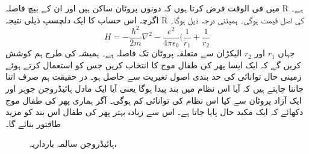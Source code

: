 میں فی الوقت فرض کرتا ہوں کہ دونوں پروٹان ساکن ہیں اور ان کے بیچ فاصلہ R ہے۔ اگرچہ اس حساب کا ایک دلچسپ ذیلی نتیجہ R کی اصل قیمت ہوگی۔ ہمیٹنی درجہ ذیل ہوگا۔
 \[H=-\frac{\hbar^{2}}{2m}\nabla^{2}-\frac{e^{2}}{4\pi\epsilon_{0}}(\frac{1}{r_{1}}+\frac{1}{r_{2}}\]
جہاں
\( r_{1}\) 
اور 
\(r_{2}\) 
الیکڑان سے متعلقہ پروٹان تک فاصلہ ہے۔ ہمیشہ کی طرح ہم کوشش کریں گے کہ ایک ایسا پھر کی طفال موج کا انتخاب کریں جس کو استعمال کرتے ہوئے زمینی حال توانائی کی حد بندی اصول تغیریت سے حاصل ہو۔ در حقیقت ہم صرف اتنا جاننا چاہتے ہیں کہ آیا اس نظام میں بند پیدا ہوگا یعنی آیا ایک مادل ہائیڈروجن جوہر اور ایک آزاد پروٹان سے کیا اس نظام کی توانائی کم ہوگی۔ آگر ہماری پھر کی طفال موج دکھائے کہ ایک مکید حال پایا جاتا ہے۔ اس سے زیادہ بہتر پھر کی طفال اس بند کو مزید طاقتور بنائے گا۔
\begin{figure}
\centering
{}
\caption{ہائیڈروجن سالمہ بارداریہ، }
\label{شکل_تغیریت_ہائیڈروجن_سالمہ_بارداریہ}
\end{figure}


